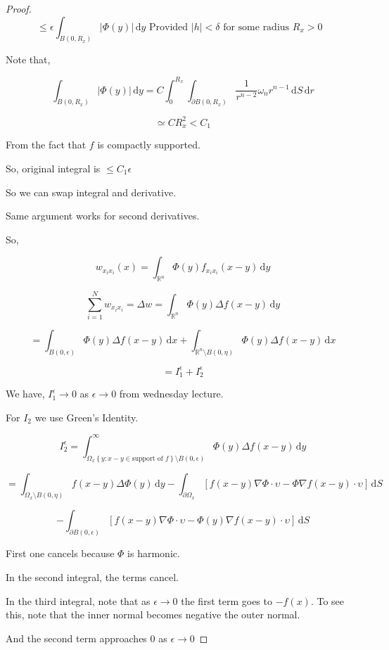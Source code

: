 \documentclass{article}
\theoremstyle{definition}
\begin{document}
\begin{proof}
    \[
        \leq \epsilon \int_{B(0,R_x)}^{} \vert \Phi(y) \vert  \,\mathrm{d}y  \text{ Provided \(\vert h \vert < \delta\) for some radius \(R_x > 0\) } 
    \]

    Note that,

    \[
        \int_{B(0,R_x)}^{} \vert \Phi(y) \vert  \,\mathrm{d}y = C \int_{0}^{R_x} \int_{\partial B(0,R_x)} \frac{1}{r^{n-2} }\omega _n r^{n-1} \,\mathrm{d}S \, \mathrm{d}r
    \]

    \[
        \simeq C R_x^2 < C_1
    \]

    From the fact that \(f\) is compactly supported.

    So, original integral is \(\leq C_1 \epsilon \) 

    So we can swap integral and derivative.

    Same argument works for second derivatives.

    So,

    \[
        w_{x_i x_i}(x) = \int_{\mathbb{R} ^n}^{} \Phi(y) f_{x_i x_i} (x-y) \,\mathrm{d}y 
    \]  


    \[
        \sum_{i=1}^{N} w_{x_i x_i} = \Delta w = \int_{\mathbb{R} ^n}^{} \Phi(y) \Delta f(x-y) \,\mathrm{d}y 
    \]

    \[
        = \int_{B(0,\epsilon )}^{} \Phi(y) \Delta f(x-y) \,\mathrm{d}x + \int_{\mathbb{R} ^n \setminus B(0,\eta)}^{} \Phi(y) \Delta f(x-y) \,\mathrm{d}x 
    \]

    \[
        = I_1^{\epsilon } + I_2^{\epsilon} 
    \]

    We have, \(I_1^{\epsilon} \to 0\) as \(\epsilon \to 0\) from wednesday lecture.

    For \(I_2\) we use Green's Identity.

    \[
        I_2^\epsilon = \int_{ \Omega_x \left\{ y:x-y\in \text{support of \(f\)} \right\} \setminus B(0,\epsilon) }^{\infty} \Phi(y) \Delta f(x-y)  \,\mathrm{d}y 
    \]

    \[
        =\int_{\Omega_x \setminus B(0,\eta)}^{} f(x-y)\Delta \Phi(y) \,\mathrm{d}y - \int_{\partial \Omega_x}^{} \left[ f(x-y)\nabla \Phi \cdot \upsilon - \Phi \nabla f(x-y)\cdot \upsilon\right] \,\mathrm{d}S
    \]

    \[
        - \int_{\partial B(0,\epsilon)}^{} \left[ f(x-y)\nabla\Phi\cdot \upsilon - \Phi(y)\nabla f(x-y)\cdot \upsilon \right] \,\mathrm{d}S 
    \]

    First one cancels because \(\Phi\) is harmonic.

    In the second integral, the terms cancel.

    In the third integral, note that as \(\epsilon \to 0\) the first term goes to \(-f(x)\). To see this, note that the inner normal becomes negative the outer normal.
    
    And the second term approaches \(0\) as \(\epsilon \to 0\)  

\end{proof}
\end{document}
